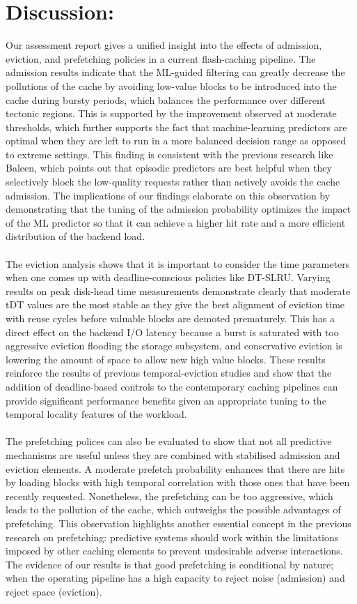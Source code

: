 \documentclass[sigconf]{acmart}
\begin{document}
{\section{Discussion:}
\large Our assessment report gives a unified insight into the effects of admission, eviction, and prefetching policies in a current flash-caching pipeline. The admission results indicate that the ML-guided filtering can greatly decrease the pollutions of the cache by avoiding low-value blocks to be introduced into the cache during bursty periods, which balances the performance over different tectonic regions. This is supported by the improvement observed at moderate thresholds, which further supports the fact that machine-learning predictors are optimal when they are left to run in a more balanced decision range as opposed to extreme settings. This finding is consistent with the previous research like Baleen, which points out that episodic predictors are best helpful when they selectively block the low-quality requests rather than actively avoids the cache admission. The implications of our findings elaborate on this observation by demonstrating that the tuning of the admission probability optimizes the impact of the ML predictor so that it can achieve a higher hit rate and a more efficient distribution of the backend load.\\
\\The eviction analysis shows that it is important to consider the time parameters when one comes up with deadline-conscious policies like DT-SLRU. Varying results on peak disk-head time measurements demonstrate clearly that moderate tDT values are the most stable as they give the best alignment of eviction time with reuse cycles before valuable blocks are demoted prematurely. This has a direct effect on the backend I/O latency because a burst is saturated with too aggressive eviction flooding the storage subsystem, and conservative eviction is lowering the amount of space to allow new high value blocks. These results reinforce the results of previous temporal-eviction studies and show that the addition of deadline-based controls to the contemporary caching pipelines can provide significant performance benefits given an appropriate tuning to the temporal locality features of the workload.\\
\\The prefetching polices can also be evaluated to show that not all predictive mechanisms are useful unless they are combined with stabilised admission and eviction elements. A moderate prefetch probability enhances that there are hits by loading blocks with high temporal correlation with those ones that have been recently requested. Nonetheless, the prefetching can be too aggressive, which leads to the pollution of the cache, which outweighs the possible advantages of prefetching. This observation highlights another essential concept in the previous research on prefetching: predictive systems should work within the limitations imposed by other caching elements to prevent undesirable adverse interactions. The evidence of our results is that good prefetching is conditional by nature; when the operating pipeline has a high capacity to reject noise (admission) and reject space (eviction).\\
}
\end{document}
